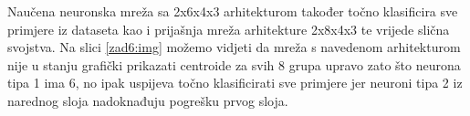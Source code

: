 \documentclass[times, utf8, seminar]{fer}
\begin{document}
Naučena neuronska mreža sa 2x6x4x3 arhitekturom također točno klasificira sve primjere iz dataseta kao i prijašnja mreža arhitekture 2x8x4x3 te vrijede slična svojstva. Na slici \ref{zad6:img} možemo vidjeti da mreža s navedenom arhitekturom nije u stanju grafički prikazati centroide za svih 8 grupa upravo zato što neurona tipa 1 ima 6, no ipak uspijeva točno klasificirati sve primjere jer neuroni tipa 2 iz narednog sloja nadoknađuju pogrešku prvog sloja.



\nocite{*}
\end{document}
